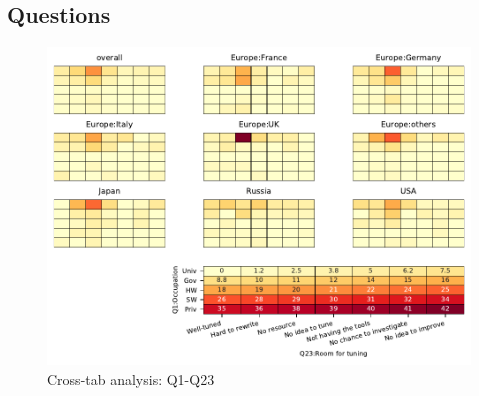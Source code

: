 
\subsection{Questions}


\begin{figure}
\begin{center}
\includegraphics[width=12cm]{../pdfs/Q1-Q23.pdf}
\caption{Cross-tab analysis: Q1-Q23}
\label{fig:Q1-Q23}
\end{center}
\end{figure}
